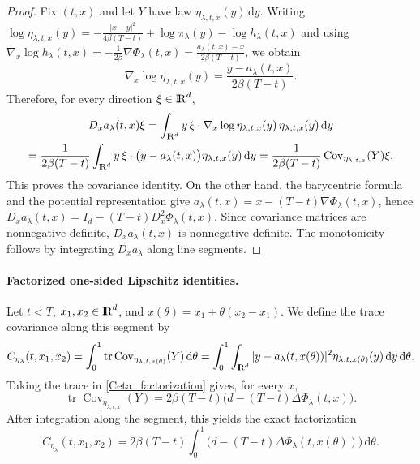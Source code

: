 \documentclass[11pt]{amsart}
\def\R{\mathrm{I\kern-0.21emR}}
\newcommand{\dd}{\,\mathrm{d}}
\renewcommand{\Vert}{|}
\numberwithin{equation}{section}
\numberwithin{figure}{section}
\theoremstyle{definition}\newtheorem{remark}[theorem]{Remark}%
\begin{document}
\begin{proof}
Fix $(t,x)$ and let $Y$ have law $\eta_{\lambda,t,x}(y)\dd y$. Writing $\log \eta_{\lambda,t,x}(y) = -\frac{\Vert x-y\Vert^2}{4\beta(T-t)} + \log\pi_\lambda(y) - \log h_\lambda(t,x)$ and using $\nabla_x \log h_\lambda(t,x) = -\frac{1}{2\beta}\nabla\Phi_\lambda(t,x) = \frac{a_\lambda(t,x) - x}{2\beta(T-t)}$, we obtain
$$
\nabla_x\log \eta_{\lambda,t,x}(y)
= \frac{y-a_\lambda(t,x)}{2\beta(T-t)}.
$$
Therefore, for every direction $\xi\in\R^d$,
\begin{multline*}
D_xa_\lambda(t,x)\xi
= \int_{\R^d} y\,\xi\cdot\nabla_x\log\eta_{\lambda,t,x}(y)\,\eta_{\lambda,t,x}(y)\dd y \\
= \frac{1}{2\beta(T-t)}\int_{\R^d} y\,\xi\cdot\big(y-a_\lambda(t,x)\big)\eta_{\lambda,t,x}(y)\dd y 
= \frac{1}{2\beta(T-t)}\operatorname{Cov}_{\eta_{\lambda,t,x}}(Y)\xi.
\end{multline*}
This proves the covariance identity. On the other hand, the barycentric formula and the potential representation give $a_\lambda(t,x)=x-(T-t)\nabla\Phi_\lambda(t,x)$, hence $D_xa_\lambda(t,x)=I_d-(T-t)D_x^2\Phi_\lambda(t,x)$. Since covariance matrices are nonnegative definite, $D_xa_\lambda(t,x)$ is nonnegative definite. The monotonicity follows by integrating $D_xa_\lambda$ along line segments.
\end{proof}

\paragraph{\bf Factorized one-sided Lipschitz identities.}
Let $t<T$, $x_1,x_2\in\R^d$, and $x(\theta)=x_1+\theta(x_2-x_1)$. We define the trace covariance along this segment by
\begin{equation}\label{eq:Ceta}
C_{\eta_\lambda}(t,x_1,x_2)
= \int_0^1 \operatorname{tr}\operatorname{Cov}_{\eta_{\lambda,t,x(\theta)}}(Y)\dd\theta 
= \int_0^1\int_{\R^d}\Vert y-a_\lambda(t,x(\theta))\Vert^2\eta_{\lambda,t,x(\theta)}(y)\dd y\dd\theta.
\end{equation}
Taking the trace in \eqref{Ceta_factorization} gives, for every $x$,
$$
\operatorname{tr}\operatorname{Cov}_{\eta_{\lambda,t,x}}(Y)
= 2\beta(T-t)\big(d-(T-t)\Delta\Phi_\lambda(t,x)\big).
$$
After integration along the segment, this yields the exact factorization
\begin{equation}\label{Ceta_terminal_factorized}
C_{\eta_\lambda}(t,x_1,x_2)
= 2\beta(T-t)\int_0^1\big(d-(T-t)\Delta\Phi_\lambda(t,x(\theta))\big)\dd\theta.
\end{equation}
\end{document}
